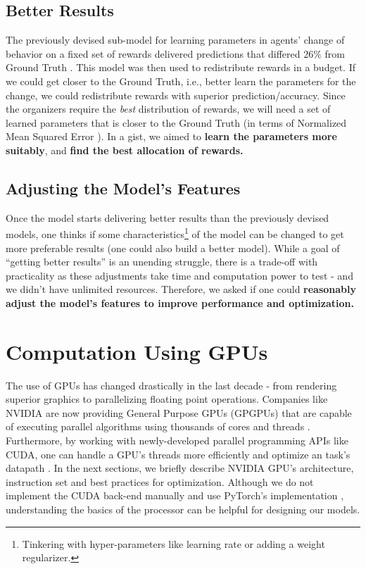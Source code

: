 \subsection{Better Results} \label{sec:Important Questions - Better Results}
The previously devised sub-model for learning parameters in agents' change of behavior on a fixed set of rewards delivered predictions that differed $26\%$ from Ground Truth \cite[Table~1]{Xue2016Avi2}. This model was then used to redistribute rewards in a budget. If we could get closer to the Ground Truth, i.e., better learn the parameters for the change, we could redistribute rewards with superior prediction/accuracy. Since the organizers require the \textit{best} distribution of rewards, we will need a set of learned parameters that is closer to the Ground Truth (in terms of Normalized Mean Squared Error \cite[Section~4.2]{Xue2016Avi2}). In a gist, we aimed to \textbf{learn the parameters more suitably}, and \textbf{find the  best allocation of rewards.}

\subsection{Adjusting the Model's Features} \label{sec:Important Questions - Adjusting the Model's Features}
Once the model starts delivering better results than the previously devised models, one thinks if some characteristics\footnote{Tinkering with hyper-parameters like learning rate or adding a weight regularizer.} of the model can be changed to get more preferable results (one could also build a better model). While a goal of ``getting better results'' is an unending struggle, there is a trade-off with practicality as these adjustments take time and computation power to test - and we didn't have unlimited resources. Therefore, we asked if one could \textbf{reasonably adjust the model's features to improve performance and optimization.}

\section{Computation Using GPUs} \label{sec:Computation Using GPUs}
The use of GPUs has changed drastically in the last decade - from rendering superior graphics to parallelizing floating point operations. Companies like NVIDIA are now providing General Purpose GPUs (GPGPUs) that are capable of executing parallel algorithms using thousands of cores and threads \cite{NVIDIA}. Furthermore, by working with newly-developed parallel programming APIs like CUDA, one can handle a GPU's threads more efficiently and optimize an task's datapath \cite{CUDADocs}. In the next sections, we briefly describe NVIDIA GPU's architecture, instruction set and best practices for optimization. Although we do not implement the CUDA back-end manually and use PyTorch's implementation \cite{PTDocs}, understanding the basics of the processor can be helpful for designing our models.

